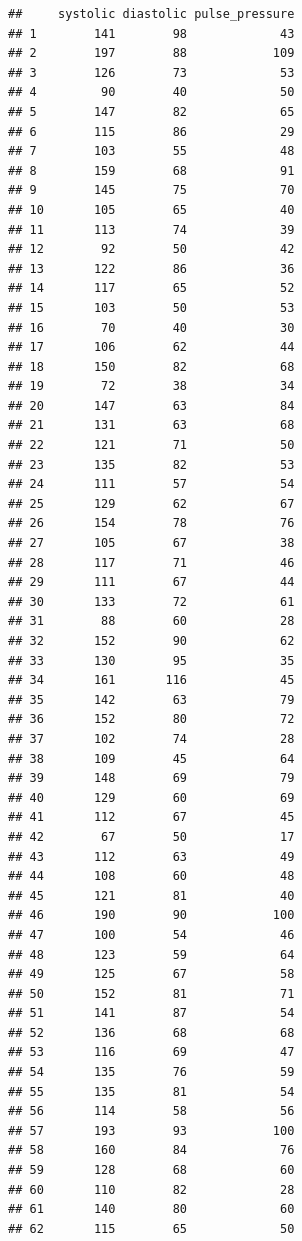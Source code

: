 \documentclass[
  10pt,
]{krantz}
\begin{document}
\begin{verbatim}
##     systolic diastolic pulse_pressure
## 1        141        98             43
## 2        197        88            109
## 3        126        73             53
## 4         90        40             50
## 5        147        82             65
## 6        115        86             29
## 7        103        55             48
## 8        159        68             91
## 9        145        75             70
## 10       105        65             40
## 11       113        74             39
## 12        92        50             42
## 13       122        86             36
## 14       117        65             52
## 15       103        50             53
## 16        70        40             30
## 17       106        62             44
## 18       150        82             68
## 19        72        38             34
## 20       147        63             84
## 21       131        63             68
## 22       121        71             50
## 23       135        82             53
## 24       111        57             54
## 25       129        62             67
## 26       154        78             76
## 27       105        67             38
## 28       117        71             46
## 29       111        67             44
## 30       133        72             61
## 31        88        60             28
## 32       152        90             62
## 33       130        95             35
## 34       161       116             45
## 35       142        63             79
## 36       152        80             72
## 37       102        74             28
## 38       109        45             64
## 39       148        69             79
## 40       129        60             69
## 41       112        67             45
## 42        67        50             17
## 43       112        63             49
## 44       108        60             48
## 45       121        81             40
## 46       190        90            100
## 47       100        54             46
## 48       123        59             64
## 49       125        67             58
## 50       152        81             71
## 51       141        87             54
## 52       136        68             68
## 53       116        69             47
## 54       135        76             59
## 55       135        81             54
## 56       114        58             56
## 57       193        93            100
## 58       160        84             76
## 59       128        68             60
## 60       110        82             28
## 61       140        80             60
## 62       115        65             50

\end{verbatim}
\end{document}
